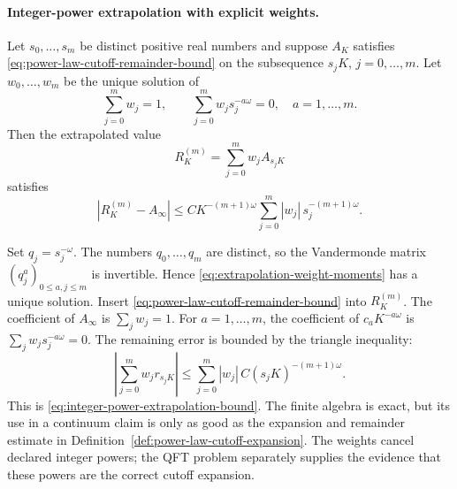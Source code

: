 \paragraph{Integer-power extrapolation with explicit weights.}
Let \(s_0,\ldots,s_m\) be distinct positive real numbers and suppose
\(A_K\) satisfies \eqref{eq:power-law-cutoff-remainder-bound} on the
subsequence \(s_jK\), \(j=0,\ldots,m\).  Let \(w_0,\ldots,w_m\) be the unique
solution of
\begin{equation}
  \sum_{j=0}^m w_j=1,
  \qquad
  \sum_{j=0}^m w_j s_j^{-a\omega}=0,
  \quad a=1,\ldots,m .
  \label{eq:extrapolation-weight-moments}
\end{equation}
Then the extrapolated value
\[
  R_K^{(m)}
  =
  \sum_{j=0}^m w_j A_{s_jK}
\]
satisfies
\begin{equation}
  |R_K^{(m)}-A_\infty|
  \le
  C K^{-(m+1)\omega}
  \sum_{j=0}^m |w_j|\,s_j^{-(m+1)\omega}.
  \label{eq:integer-power-extrapolation-bound}
\end{equation}

Set \(q_j=s_j^{-\omega}\).  The numbers \(q_0,\ldots,q_m\) are distinct,
so the Vandermonde matrix \((q_j^a)_{0\le a,j\le m}\) is invertible.  Hence
\eqref{eq:extrapolation-weight-moments} has a unique solution.  Insert
\eqref{eq:power-law-cutoff-remainder-bound} into \(R_K^{(m)}\).  The
coefficient of \(A_\infty\) is \(\sum_jw_j=1\).  For
\(a=1,\ldots,m\), the coefficient of \(c_aK^{-a\omega}\) is
\(\sum_jw_js_j^{-a\omega}=0\).  The remaining error is bounded by the
triangle inequality:
\[
  \left|\sum_{j=0}^m w_j r_{s_jK}\right|
  \le
  \sum_{j=0}^m |w_j|\,C(s_jK)^{-(m+1)\omega}.
\]
This is \eqref{eq:integer-power-extrapolation-bound}.
The finite algebra is exact, but its use in a continuum claim is only as good
as the expansion and remainder estimate in
Definition~\ref{def:power-law-cutoff-expansion}.  The weights cancel declared
integer powers; the QFT problem separately supplies the evidence that these
powers are the correct cutoff expansion.

